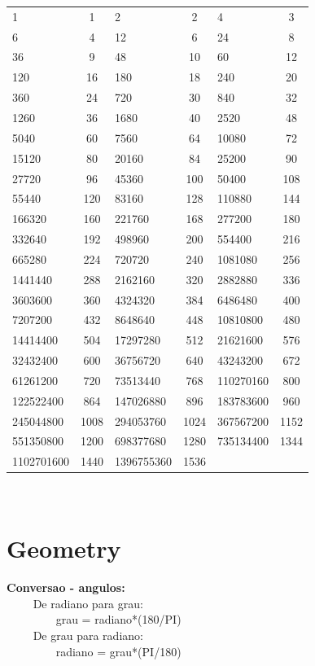 \documentclass[10pt, twocolumn]{article}
\begin{document}
\begin{flushleft}
\begin{center}
{\begin{tabu}[H]{|a|c|a|c|a|c|}
1 & 1 & 2 & 2 & 4 & 3\\
6 & 4 & 12 & 6 & 24 & 8\\
36 & 9 & 48 & 10 & 60 & 12\\
120 & 16 & 180 & 18 & 240 & 20\\
360 & 24 & 720 & 30 & 840 & 32\\
1260 & 36 & 1680 & 40 & 2520 & 48\\
5040 & 60 & 7560 & 64 & 10080 & 72\\
15120 & 80 & 20160 & 84 & 25200 & 90\\
27720 & 96 & 45360 & 100 & 50400 & 108\\
55440 & 120 & 83160 & 128 & 110880 & 144\\
166320 & 160 & 221760 & 168 & 277200 & 180\\
332640 & 192 & 498960 & 200 & 554400 & 216\\
665280 & 224 & 720720 & 240 & 1081080 & 256\\
1441440 & 288 & 2162160 & 320 & 2882880 & 336\\
3603600 & 360 & 4324320 & 384 & 6486480 & 400\\
7207200 & 432 & 8648640 & 448 & 10810800 & 480\\
14414400 & 504 & 17297280 & 512 & 21621600 & 576\\
32432400 & 600 & 36756720 & 640 & 43243200 & 672\\
61261200 & 720 & 73513440 & 768 & 110270160 & 800\\
122522400 & 864 & 147026880 & 896 & 183783600 & 960\\
245044800 & 1008 & 294053760 & 1024 & 367567200 & 1152\\
551350800 & 1200 & 698377680 & 1280 & 735134400 & 1344\\
1102701600 & 1440 & 1396755360 & 1536\\

\end{tabu}}\\[0.5cm]
\end{center}


\section{Geometry}
\textbf{Conversao - angulos:}\\
$\qquad$ De radiano para grau:\\
$\qquad \qquad$ grau = radiano*(180/PI)\\
$\qquad$ De grau para radiano:\\
$\qquad \qquad$ radiano = grau*(PI/180)\\[0.5cm]


\end{flushleft}
\end{document}
